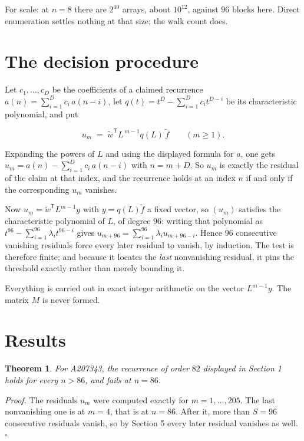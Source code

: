 \documentclass[11pt]{article}
\newtheorem{theorem}{Theorem}
\theoremstyle{definition}
\begin{document}
For scale: at $n = 8$ there are $2^{40}$ arrays, about $10^{12}$, against $96$ blocks here. Direct enumeration settles nothing at that size; the walk count does.

\section{The decision procedure}

Let $c_1,\dots,c_D$ be the coefficients of a claimed recurrence $a(n) = \sum_{i=1}^{D} c_i\,a(n-i)$, let $q(t) = t^{D} - \sum_{i=1}^{D} c_i t^{D-i}$ be its characteristic polynomial, and put

\[u_m \;=\; \tilde w^{\mathsf T} L^{\,m-1} q(L)\,\tilde f \qquad (m \ge 1).\]

Expanding the powers of $L$ and using the displayed formula for $a$, one gets $u_m = a(n) - \sum_{i=1}^{D} c_i\,a(n-i)$ with $n = m + D$. So $u_m$ is exactly the residual of the claim at that index, and the recurrence holds at an index $n$ if and only if the corresponding $u_m$ vanishes.

Now $u_m = \tilde w^{\mathsf T} L^{m-1} y$ with $y = q(L)\tilde f$ a fixed vector, so $(u_m)$ satisfies the characteristic polynomial of $L$, of degree $96$: writing that polynomial as $t^{96} - \sum_{i=1}^{96} \lambda_i t^{96-i}$ gives $u_{m+96} = \sum_{i=1}^{96} \lambda_i u_{m+96-i}$. Hence $96$ consecutive vanishing residuals force every later residual to vanish, by induction. The test is therefore finite; and because it locates the {\itshape last} nonvanishing residual, it pins the threshold exactly rather than merely bounding it.

Everything is carried out in exact integer arithmetic on the vector $L^{m-1}y$. The matrix $M$ is never formed.

\section{Results}

\begin{theorem} For A207343, the recurrence of order $82$ displayed in Section 1 holds for every $n > 86$, and fails at $n = 86$.\end{theorem}

{\itshape Proof.} The residuals $u_m$ were computed exactly for $m = 1,\dots,205$. The last nonvanishing one is at $m = 4$, that is at $n = 86$. After it, more than $S = 96$ consecutive residuals vanish, so by Section 5 every later residual vanishes as well. $\square$
\end{document}
